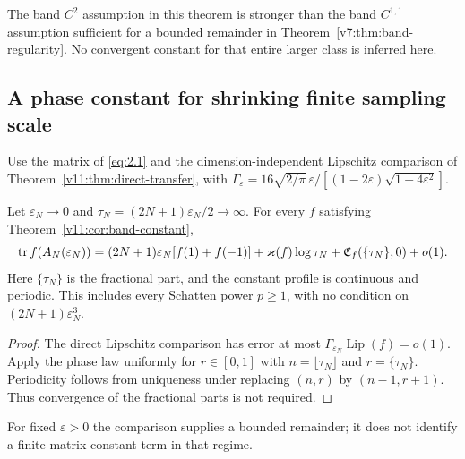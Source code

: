 The band $C^2$ assumption in this theorem is stronger than the band
$C^{1,1}$ assumption sufficient for a bounded remainder in
Theorem~\ref{v7:thm:band-regularity}.  No convergent constant for that
entire larger class is inferred here.


\subsection{A phase constant for shrinking finite sampling scale}
Use the matrix of \eqref{eq:2.1} and the dimension-independent Lipschitz
comparison of Theorem~\ref{v11:thm:direct-transfer}, with
$\Gamma_\varepsilon=16\sqrt{2/\pi}\,\varepsilon/
[(1-2\varepsilon)\sqrt{1-4\varepsilon^2}]$.

\begin{corollary}
\label{v11:cor:finite-phase-constant}
Let $\varepsilon_N\to0$ and
$\tau_N=(2N+1)\varepsilon_N/2\to\infty$.  For every $f$ satisfying
Theorem~\ref{v11:cor:band-constant},
\begin{equation}\label{v11:eq:finite-phase-constant}
 \operatorname{tr} f(A_N(\varepsilon_N))
 =(2N+1)\varepsilon_N[f(1)+f(-1)]
  +\varkappa(f)\log\tau_N
  +\mathfrak C_f(\{\tau_N\},0)+o(1).
\end{equation}
Here $\{\tau_N\}$ is the fractional part, and the constant profile is
continuous and periodic.  This includes every Schatten power $p\ge1$,
with no condition on $(2N+1)\varepsilon_N^3$.
\end{corollary}
\begin{proof}
The direct Lipschitz comparison has error at most
$\Gamma_{\varepsilon_N}\operatorname{Lip}(f)=o(1)$.
Apply the phase law uniformly for $r\in[0,1]$ with
$n=\lfloor\tau_N\rfloor$ and $r=\{\tau_N\}$.
Periodicity follows from uniqueness under replacing $(n,r)$ by
$(n-1,r+1)$.  Thus convergence of the fractional parts is not required.
\end{proof}

For fixed $\varepsilon>0$ the comparison supplies a bounded remainder;
it does not identify a finite-matrix constant term in that regime.

